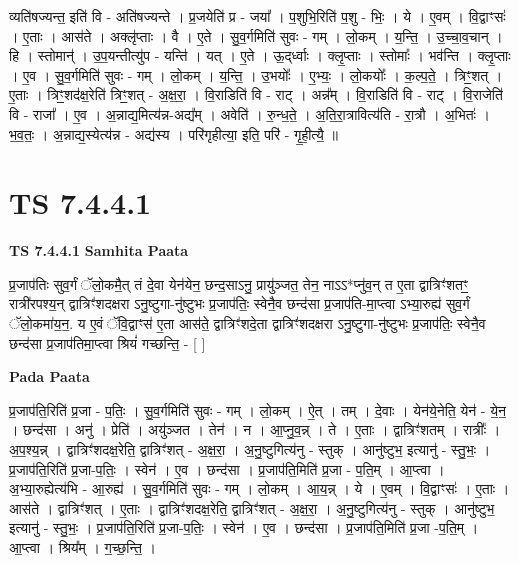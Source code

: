 \documentclass[17pt]{extarticle}
\begin{document}
व्यति॑षज्यन्त॒ इति॑ वि - अति॑षज्यन्ते । प्र॒जयेति॑ प्र - जया᳚ । प॒शुभि॒रिति॑ प॒शु - भिः॒ । ये । ए॒वम् । वि॒द्वाꣳसः॑ । ए॒ताः । आस॑ते । अक्लृ॑प्ताः । वै । ए॒ते । सु॒व॒र्गमिति॑ सुवः - गम् । लो॒कम् । य॒न्ति॒ । उ॒च्चा॒व॒चान् । हि । स्तोमान्॑ । उ॒प॒यन्तीत्यु॑प - यन्ति॑ । यत् । ए॒ते । ऊ॒द्‌र्ध्वाः । क्लृ॒प्ताः । स्तोमाः᳚ । भव॑न्ति । क्लृ॒प्ताः । ए॒व । सु॒व॒र्गमिति॑ सुवः - गम् । लो॒कम् । य॒न्ति॒ । उ॒भयोः᳚ । ए॒भ्यः॒ । लो॒कयोः᳚ । क॒ल्प॒ते॒ । त्रिꣳ॒॒शत् । ए॒ताः । त्रिꣳ॒॒शद॑क्ष॒रेति॑ त्रिꣳ॒॒शत् - अ॒क्ष॒रा॒ । वि॒राडिति॑ वि - राट् । अन्न᳚म् । वि॒राडिति॑ वि - राट् । वि॒राजेति॑ वि - राजा᳚ । ए॒व । अ॒न्नाद्य॒मित्य॑न्न-अद्य᳚म् । अवेति॑ । रु॒न्ध॒ते॒ । अ॒ति॒रा॒त्रावित्य॑ति - रा॒त्रौ । अ॒भितः॑ । भ॒व॒तः॒ । अ॒न्नाद्य॒स्येत्य॑न्न - अद्य॑स्य । परि॑गृहीत्या॒ इति॒ परि॑ - गृ॒ही॒त्यै॒ ॥  \newline




\section*{ TS 7.4.4.1 }

\textbf{TS 7.4.4.1 } \newline
\textbf{Samhita Paata} \newline

प्र॒जाप॑तिः सुव॒र्गं ॅलो॒कमै॒त् तं दे॒वा येन॑येन॒ छन्द॒साऽनु॒ प्रायु॑ञ्जत॒ तेन॒ नाऽऽ*प्नु॑व॒न् त ए॒ता द्वात्रिꣳ॑शतꣳ॒॒ रात्री॑रपश्य॒न् द्वात्रिꣳ॑शदक्षरा ऽनु॒ष्टुगा-नु॑ष्टुभः प्र॒जाप॑तिः॒ स्वेनै॒व छन्द॑सा प्र॒जाप॑ति-मा॒प्त्वा ऽभ्या॒रुह्य॑ सुव॒र्गं ॅलो॒कमा॑य॒न॒. य ए॒वं ॅवि॒द्वाꣳस॑ ए॒ता आस॑ते॒ द्वात्रिꣳ॑शदे॒ता द्वात्रिꣳ॑शदक्षरा ऽनु॒ष्टुगा-नु॑ष्टुभः प्र॒जाप॑तिः॒ स्वेनै॒व छन्द॑सा प्र॒जाप॑तिमा॒प्त्वा श्रियं॑ गच्छन्ति॒ - [  ] \newline

\textbf{Pada Paata} \newline

प्र॒जाप॑ति॒रिति॑ प्र॒जा - प॒तिः॒ । सु॒व॒र्गमिति॑ सुवः - गम् । लो॒कम् । ऐ॒त् । तम् । दे॒वाः । येन॑ये॒नेति॒ येन॑ - ये॒न॒ । छन्द॑सा । अनु॑ । प्रेति॑ । अयु॑ञ्जत । तेन॑ । न । आ॒प्नु॒व॒न्न् । ते । ए॒ताः । द्वात्रिꣳ॑शतम् । रात्रीः᳚ । अ॒प॒श्य॒न्न् । द्वात्रिꣳ॑शदक्ष॒रेति॒ द्वात्रिꣳ॑शत् - अ॒क्ष॒रा॒ । अ॒नु॒ष्टुगित्य॑नु - स्तुक् । आनु॑ष्टुभ॒ इत्यानु॑ - स्तु॒भः॒ । प्र॒जाप॑ति॒रिति॑ प्र॒जा-प॒तिः॒ । स्वेन॑ । ए॒व । छन्द॑सा । प्र॒जाप॑ति॒मिति॑ प्र॒जा - प॒ति॒म् । आ॒प्त्वा । अ॒भ्या॒रुह्येत्य॑भि - आ॒रुह्य॑ । सु॒व॒र्गमिति॑ सुवः - गम् । लो॒कम् । आ॒य॒न्न् । ये । ए॒वम् । वि॒द्वाꣳसः॑ । ए॒ताः । आस॑ते । द्वात्रिꣳ॑शत् । ए॒ताः । द्वात्रिꣳ॑शदक्ष॒रेति॒ द्वात्रिꣳ॑शत् - अ॒क्ष॒रा॒ । अ॒नु॒ष्टुगित्य॑नु - स्तुक् । आनु॑ष्टुभ॒ इत्यानु॑ - स्तु॒भः॒ । प्र॒जाप॑ति॒रिति॑ प्र॒जा-प॒तिः॒ । स्वेन॑ । ए॒व । छन्द॑सा । प्र॒जाप॑ति॒मिति॑ प्र॒जा -प॒ति॒म् । आ॒प्त्वा । श्रिय᳚म् । ग॒च्छ॒न्ति॒ ।  \newline
\end{document}
